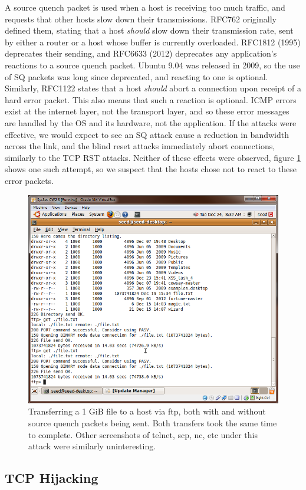 A source quench packet is used when a host is receiving too much traffic, and requests that other hosts slow down their
transmissions. RFC762\cite{rfc762} originally defined them, stating that a host \emph{should} slow down their
transmission rate, sent by either a router or a host whose buffer is currently overloaded. RFC1812\cite{rfc1812} (1995)
deprecates their sending, and RFC6633\cite{rfc6633} (2012) deprecates any application's reactions to a source quench
packet. Ubuntu 9.04 was released in 2009, so the use of SQ packets was long since deprecated, and reacting to one is
optional. Similarly, RFC1122\cite{rfc1122} states that a host \emph{should} abort a connection upon receipt of a hard
error packet. This also means that such a reaction is optional. ICMP errors exist at the internet layer, not the
transport layer, and so these error messages are handled by the OS and its hardware, not the application. If the attacks
were effective, we would expect to see an SQ attack cause a reduction in bandwidth across the link, and the blind reset
attacks immediately abort connections, similarly to the TCP RST attacks.  Neither of these effects were observed, figure
\ref{fig:ftp_sq} shows one such attempt, so we suspect that the hosts chose not to react to these error packets.

\begin{figure}[h]
    \centering
    \includegraphics[width=.5\linewidth]{images/ftp_vs_sq.png}
    \caption{Transferring a 1 GiB file to a host via ftp, both with and without source quench packets being sent. Both
    transfers took the same time to complete. Other screenshots of telnet, scp, nc, etc under this attack were similarly
    uninteresting.}
    \label{fig:ftp_sq}
\end{figure}

\subsection{TCP Hijacking}

